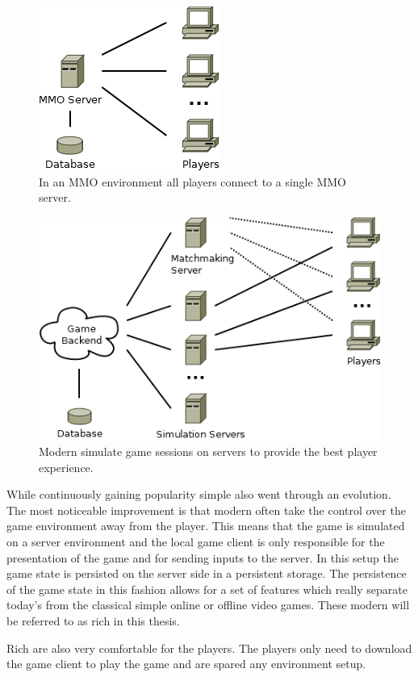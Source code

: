 \begin{figure}
  \centering
  \includegraphics[width=.36\linewidth]{images/MMO}
  \caption{In an MMO environment all players connect to a single MMO server.}
  \label{fig:mmo}
\end{figure}
\begin{figure}
  \centering
  \includegraphics[width=.76\linewidth]{images/RichOnlineGame}
  \caption{Modern \og{} simulate game sessions on servers to provide the best
  player experience.}
  \label{fig:rich_online_game}
\end{figure}

While continuously gaining popularity simple \ogs{} also went through an
evolution. The most noticeable improvement is that modern \ogs{} often take the
control over the game environment away from the player. This means that the game
is simulated on a server environment and the local game client is only
responsible for the presentation of the game and for sending inputs to the
server. In this setup the game state is persisted on the server side in a
persistent storage. The persistence of the game state in this fashion allows for
a set of features which really separate today's \ogs{} from the classical simple
online or offline video games. These modern \ogs{} will be referred to as rich
\og{} in this thesis.

Rich \ogs{} are also very comfortable for the players. The players only need to
download the game client to play the game and are spared any environment setup.

